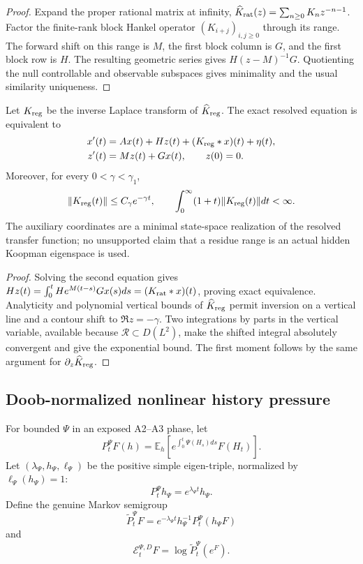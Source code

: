 \begin{proof}
Expand the proper rational matrix at infinity,
\(\widehat K_{\rm rat}(z)=\sum_{n\ge0}K_nz^{-n-1}\).  Factor the finite-rank
block Hankel operator \((K_{i+j})_{i,j\ge0}\) through its range.  The forward
shift on this range is \(M\), the first block column is \(G\), and the first
block row is \(H\).  The resulting geometric series gives
\(H(z-M)^{-1}G\).  Quotienting the null controllable and observable subspaces
gives minimality and the usual similarity uniqueness.
\end{proof}

\begin{theorem}
\label{thm:r3-a4-memory-decay}
Let \(K_{\rm reg}\) be the inverse Laplace transform of
\(\widehat K_{\rm reg}\).  The exact resolved equation is equivalent to
\[
 \begin{aligned}
 x'(t)&=Ax(t)+Hz(t)+(K_{\rm reg}*x)(t)+\eta(t),\\
 z'(t)&=Mz(t)+Gx(t),\qquad z(0)=0.
 \end{aligned}
\]
Moreover, for every \(0<\gamma<\gamma_1\),
\[
 \|K_{\rm reg}(t)\|\le C_\gamma e^{-\gamma t},
 \qquad
 \int_0^\infty(1+t)\|K_{\rm reg}(t)\|dt<\infty.
\]
The auxiliary coordinates are a minimal state-space realization of the
resolved transfer function; no unsupported claim that a residue range is an
actual hidden Koopman eigenspace is used.
\end{theorem}

\begin{proof}
Solving the second equation gives
\(Hz(t)=\int_0^tHe^{M(t-s)}Gx(s)ds=(K_{\rm rat}*x)(t)\), proving exact
equivalence.  Analyticity and polynomial vertical bounds of
\(\widehat K_{\rm reg}\) permit inversion on a vertical line and a contour
shift to \(\Re z=-\gamma\).  Two integrations by parts in the vertical
variable, available because \(\mathcal R\subset D(L^2)\), make the shifted
integral absolutely convergent and give the exponential bound.  The first
moment follows by the same argument for \(\partial_z\widehat K_{\rm reg}\).
\end{proof}

\subsection{Doob-normalized nonlinear history pressure}

For bounded \(\Psi\) in an exposed A2--A3 phase, let
\[
 P_t^\Psi F(h)=
 \mathbb E_h\left[e^{\int_0^t\Psi(H_s)ds}F(H_t)\right].
\]
Let \((\lambda_\Psi,h_\Psi,\ell_\Psi)\) be the positive simple eigen-triple,
normalized by \(\ell_\Psi(h_\Psi)=1\):
\[
 P_t^\Psi h_\Psi=e^{\lambda_\Psi t}h_\Psi.
\]
Define the genuine Markov semigroup
\[
 \widetilde P_t^\Psi F
 =e^{-\lambda_\Psi t}h_\Psi^{-1}
 P_t^\Psi(h_\Psi F)
\]
and
\[
 \mathcal E_t^{\Psi,D}F
 =\log\widetilde P_t^\Psi(e^F).
\]

